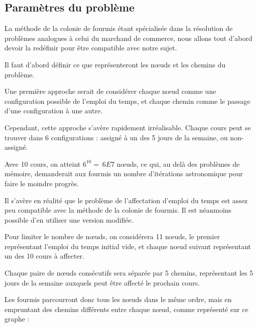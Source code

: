 
\subsection {Paramètres du problème}

La méthode de la colonie de fourmis étant spécialisée dans la résolution de problèmes analogues à celui du marchand de commerce, nous allons tout d'abord devoir la redéfinir pour être compatible avec notre sujet.

Il faut d'abord définir ce que représenteront les n\oe uds et les chemins du problème.

Une première approche serait de considérer chaque n\oe ud comme une configuration possible de l'emploi du temps, et chaque chemin comme le passage d'une configuration à une autre.

Cependant, cette approche s'avère rapidement irréalisable.
Chaque cours peut se trouver dans 6 configurations : assigné à un des 5 jours de la semaine, ou non-assigné.

Avec 10 cours, on atteint $6^{10} = ~6E7$ n\oe uds, ce qui, au delà des problèmes de mémoire, demanderait aux fourmis un nombre d'itérations astronomique pour faire le moindre progrès.

Il s'avère en réalité que le problème de l'affectation d'emploi du temps est assez peu compatible avec la méthode de la colonie de fourmis.
Il est néanmoins possible d'en utiliser une version modifiée.

Pour limiter le nombre de n\oe uds, on considérera 11 n\oe uds, le premier représentant l'emploi du temps initial vide, et chaque n\oe ud suivant représentant un des 10 cours à affecter.

Chaque paire de n\oe uds consécutifs sera séparée par 5 chemins, représentant les 5 jours de la semaine auxquels peut être affecté le prochain cours.

Les fourmis parcourront donc tous les n\oe uds dans le même ordre, mais en empruntant des chemins différents entre chaque n\oe ud, comme représenté sur ce graphe :

